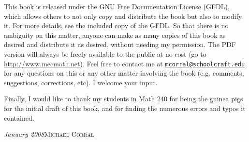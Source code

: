 This book is released under the GNU Free Documentation License (GFDL), which allows others to not only copy and
distribute the book but also to modify it. For more details, see the included copy of the GFDL. So that there is no
ambiguity on this matter, anyone can make as many copies of this book as desired and distribute it as desired,
without needing my permission.  The PDF version will always be freely available to the public at no cost
(go to \url{http://www.mecmath.net}). Feel free to
contact me at \texttt{\href{mailto:mcorral@schoolcraft.edu}{mcorral@schoolcraft.edu}} for any questions on this or any
other matter involving the book (e.g. comments, suggestions, corrections, etc). I welcome your input.

Finally, I would like to thank my students in Math 240 for being the guinea pigs for the initial draft of this book, and
for finding the numerous errors and typos it contained.

\begin{flushleft}
\emph{January 2008}\textsc{Michael Corral}
\end{flushleft}
